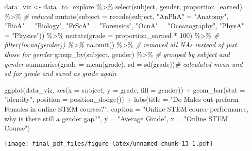 \documentclass[
]{article}
\newenvironment{Shaded}{\begin{snugshade}}{\end{snugshade}}
\newcommand{\AttributeTok}[1]{\textcolor[rgb]{0.77,0.63,0.00}{#1}}
\newcommand{\CommentTok}[1]{\textcolor[rgb]{0.56,0.35,0.01}{\textit{#1}}}
\newcommand{\DecValTok}[1]{\textcolor[rgb]{0.00,0.00,0.81}{#1}}
\newcommand{\FunctionTok}[1]{\textcolor[rgb]{0.00,0.00,0.00}{#1}}
\newcommand{\NormalTok}[1]{#1}
\newcommand{\OtherTok}[1]{\textcolor[rgb]{0.56,0.35,0.01}{#1}}
\newcommand{\SpecialCharTok}[1]{\textcolor[rgb]{0.00,0.00,0.00}{#1}}
\newcommand{\StringTok}[1]{\textcolor[rgb]{0.31,0.60,0.02}{#1}}
\begin{document}
\begin{Shaded}
\begin{Highlighting}[]
\NormalTok{data\_viz }\OtherTok{\textless{}{-}}\NormalTok{ data\_to\_explore }\SpecialCharTok{\%\textgreater{}\%}
  \FunctionTok{select}\NormalTok{(subject, gender, proportion\_earned) }\SpecialCharTok{\%\textgreater{}\%}  \CommentTok{\# reduced }
  \FunctionTok{mutate}\NormalTok{(}\AttributeTok{subject =} \FunctionTok{recode}\NormalTok{(subject, }
                          \StringTok{"AnPhA"} \OtherTok{=} \StringTok{"Anatomy"}\NormalTok{,}
                          \StringTok{"BioA"} \OtherTok{=} \StringTok{"Biology"}\NormalTok{, }
                          \StringTok{"FrScA"} \OtherTok{=} \StringTok{"Forensics"}\NormalTok{, }
                          \StringTok{"OcnA"} \OtherTok{=}  \StringTok{"Oceanography"}\NormalTok{, }
                          \StringTok{"PhysA"} \OtherTok{=} \StringTok{"Physics"}\NormalTok{)) }\SpecialCharTok{\%\textgreater{}\%}
  \FunctionTok{mutate}\NormalTok{(}\AttributeTok{grade =}\NormalTok{ proportion\_earned }\SpecialCharTok{*} \DecValTok{100}\NormalTok{) }\SpecialCharTok{\%\textgreater{}\%}
  \CommentTok{\# filter(!is.na(gender)) \%\textgreater{}\%}
  \FunctionTok{na.omit}\NormalTok{() }\SpecialCharTok{\%\textgreater{}\%} \CommentTok{\# removed all NAs instead of just those for gender}
  \FunctionTok{group\_by}\NormalTok{(subject, gender) }\SpecialCharTok{\%\textgreater{}\%} \CommentTok{\# grouped by subject and gender}
  \FunctionTok{summarise}\NormalTok{(}\AttributeTok{grade =} \FunctionTok{mean}\NormalTok{(grade), }
            \AttributeTok{sd =} \FunctionTok{sd}\NormalTok{(grade))}\CommentTok{\# calculated mean and sd for grade and saved as grade again  }

  \FunctionTok{ggplot}\NormalTok{(data\_viz, }\FunctionTok{aes}\NormalTok{(}\AttributeTok{x =}\NormalTok{ subject, }\AttributeTok{y =}\NormalTok{ grade, }
                          \AttributeTok{fill =}\NormalTok{ gender)) }\SpecialCharTok{+}
  \FunctionTok{geom\_bar}\NormalTok{(}\AttributeTok{stat =} \StringTok{"identity"}\NormalTok{, }
           \AttributeTok{position =} \FunctionTok{position\_dodge}\NormalTok{()) }\SpecialCharTok{+}
  \FunctionTok{labs}\NormalTok{(}\AttributeTok{title =} \StringTok{"Do Males out{-}preform Females in online STEM courses?"}\NormalTok{,}
       \AttributeTok{caption =} \StringTok{"Online STEM course performance, why is there still a gender gap?"}\NormalTok{,}
       \AttributeTok{y =} \StringTok{"Average Grade"}\NormalTok{,}
       \AttributeTok{x =} \StringTok{"Online STEM Course"}\NormalTok{)}
\end{Highlighting}
\end{Shaded}

\texttt{[image: final\_pdf\_files/figure-latex/unnamed-chunk-13-1.pdf]}
\end{document}
